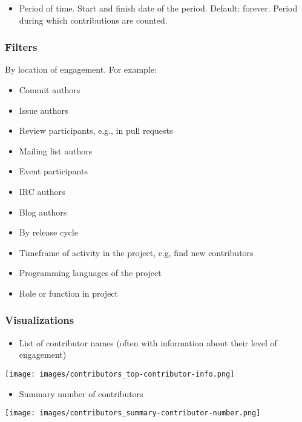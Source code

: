 \documentclass[
  12pt,
]{article}
\providecommand{\tightlist}{%
  \setlength{\itemsep}{0pt}\setlength{\parskip}{0pt}}
\begin{document}
\begin{itemize}
\tightlist
\item
  Period of time. Start and finish date of the period. Default: forever.
  Period during which contributions are counted.
\end{itemize}

\hypertarget{filters-6}{%
\subsubsection{Filters}\label{filters-6}}

By location of engagement. For example:

\begin{itemize}
\tightlist
\item
  Commit authors
\item
  Issue authors
\item
  Review participants, e.g., in pull requests
\item
  Mailing list authors
\item
  Event participants
\item
  IRC authors
\item
  Blog authors
\item
  By release cycle
\item
  Timeframe of activity in the project, e.g, find new contributors
\item
  Programming languages of the project
\item
  Role or function in project
\end{itemize}

\hypertarget{visualizations-7}{%
\subsubsection{Visualizations}\label{visualizations-7}}

\begin{itemize}
\tightlist
\item
  List of contributor names (often with information about their level of
  engagement)
\end{itemize}

\texttt{[image: images/contributors\_top-contributor-info.png]}

\begin{itemize}
\tightlist
\item
  Summary number of contributors
\end{itemize}

\texttt{[image: images/contributors\_summary-contributor-number.png]}
\end{document}

